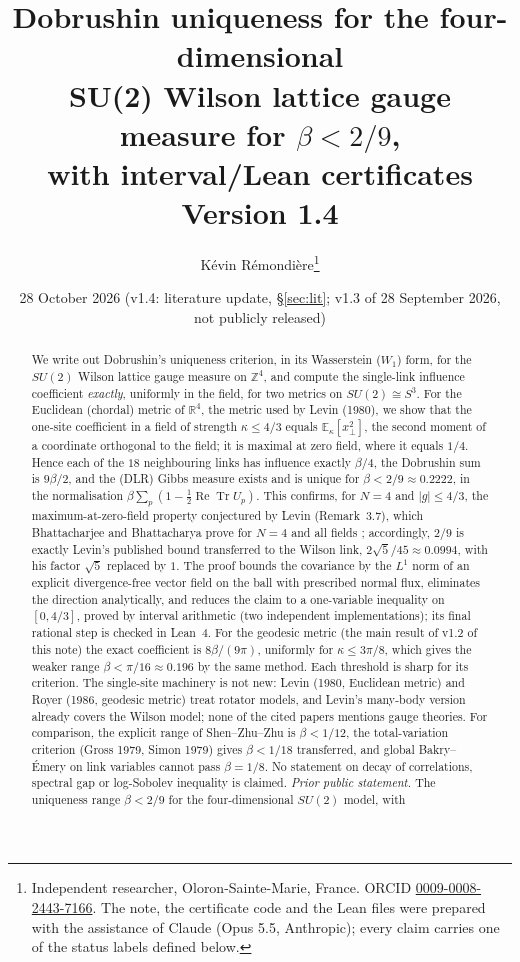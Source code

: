 \documentclass[11pt,a4paper]{article}
\title{Dobrushin uniqueness for the four-dimensional\\ SU(2) Wilson lattice gauge measure for $\beta<2/9$,\\
with interval/Lean certificates\\[4pt]
\large Version 1.4}
\author{K\'evin R\'emondi\`ere\thanks{Independent researcher, Oloron-Sainte-Marie, France. ORCID
\href{https://orcid.org/0009-0008-2443-7166}{0009-0008-2443-7166}. The note, the certificate code and the Lean
files were prepared with the assistance of Claude (Opus 5.5, Anthropic); every claim carries one of the status
labels defined below.}}
\date{28 October 2026 (v1.4: literature update, \S\ref{sec:lit}; v1.3 of 28 September 2026, not publicly released)}
\theoremstyle{remark}
\theoremstyle{definition}
\newcommand{\R}{\mathbb{R}}
\newcommand{\Z}{\mathbb{Z}}
\newcommand{\E}{\mathbb{E}}
\newcommand{\ReTr}{\operatorname{Re}\operatorname{Tr}}
\begin{document}
\maketitle

\begin{abstract}
We write out Dobrushin's uniqueness criterion, in its Wasserstein ($W_1$) form, for the $SU(2)$ Wilson lattice
gauge measure on $\Z^4$, and compute the single-link influence coefficient \emph{exactly}, uniformly in the
field, for two metrics on $SU(2)\cong S^3$.
For the Euclidean (chordal) metric of $\R^4$, the metric used by Levin (1980), we show that the one-site
coefficient in a field of strength $\kappa\le4/3$ equals $\E_\kappa[x_\perp^2]$, the second moment of a coordinate
orthogonal to the field; it is maximal at zero field, where it equals $1/4$. Hence each of the $18$ neighbouring
links has influence exactly $\beta/4$, the Dobrushin sum is $9\beta/2$, and the (DLR) Gibbs measure exists and is
unique for $\beta<2/9\approx0.2222$, in the normalisation $\beta\sum_p(1-\tfrac12\ReTr U_p)$.
This confirms, for $N=4$ and $|g|\le4/3$, the maximum-at-zero-field property conjectured by Levin (Remark~3.7), which
Bhattacharjee and Bhattacharya prove for $N=4$ and all fields \cite[Theorem~7]{BB26};
accordingly, $2/9$ is exactly Levin's published bound transferred to the Wilson link, $2\sqrt5/45\approx0.0994$,
with his factor $\sqrt5$ replaced by $1$.
The proof bounds the covariance by the $L^1$ norm of an explicit divergence-free vector field on the ball with
prescribed normal flux, eliminates the direction analytically, and reduces the claim to a one-variable
inequality on $[0,4/3]$, proved by interval arithmetic (two independent implementations); its final rational
step is checked in Lean~4.
For the geodesic metric (the main result of v1.2 of this note) the exact coefficient is $8\beta/(9\pi)$,
uniformly for $\kappa\le3\pi/8$, which gives the weaker range $\beta<\pi/16\approx0.196$ by the same method. Each
threshold is sharp for its criterion.
The single-site machinery is not new: Levin (1980, Euclidean metric) and Royer (1986, geodesic metric) treat
rotator models, and Levin's many-body version already covers the Wilson model; none of the cited papers
mentions gauge theories. For comparison, the explicit range of Shen--Zhu--Zhu is $\beta<1/12$, the
total-variation criterion (Gross 1979, Simon 1979) gives $\beta<1/18$ transferred, and global Bakry--\'Emery on
link variables cannot pass $\beta=1/8$. No statement on decay of correlations, spectral gap or log-Sobolev
inequality is claimed.
\emph{Prior public statement.} The uniqueness range $\beta<2/9$ for the four-dimensional $SU(2)$ model, with

\end{abstract}
\end{document}
